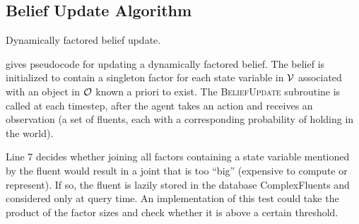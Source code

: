 \subsection{Belief Update Algorithm}
\begin{algorithm}[t]
  \SetAlgoLined
  \SetAlgoNoEnd
  \DontPrintSemicolon
  \;
\caption{Dynamically factored belief update.}
\label{alg:dynamicbeliefupdate}
\end{algorithm}

 gives pseudocode for updating a
dynamically factored belief. The belief is initialized to contain a
singleton factor for each state variable in $\mathcal{V}$ associated with an
object in $\mathcal{O}$ known a priori to exist. The \textsc{BeliefUpdate} subroutine is called at
each timestep, after the agent takes an action and receives an
observation (a set of fluents, each with a corresponding probability
of holding in the world).

Line 7 decides whether joining all factors containing a state variable
mentioned by the fluent would result in a joint that is too ``big'' (expensive to compute or represent). If so, the fluent is
lazily stored in the database ComplexFluents and considered only at
query time. An implementation of this test could take the product of
the factor sizes and check whether it is above a certain threshold.


